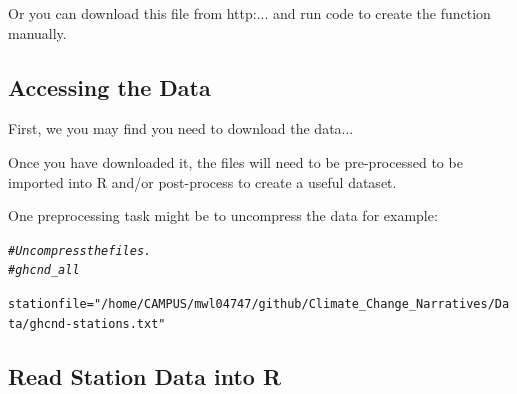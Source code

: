 \documentclass{article}\usepackage[]{graphicx}\usepackage[]{color}
\makeatletter
\newcommand{\hlstr}[1]{\textcolor[rgb]{0.192,0.494,0.8}{#1}}%
\newcommand{\hlcom}[1]{\textcolor[rgb]{0.678,0.584,0.686}{\textit{#1}}}%
\newcommand{\hlstd}[1]{\textcolor[rgb]{0.345,0.345,0.345}{#1}}%
\newcommand{\hlkwb}[1]{\textcolor[rgb]{0.69,0.353,0.396}{#1}}%
\newenvironment{kframe}{%
 \def\at@end@of@kframe{}%
 \ifinner\ifhmode%
  \def\at@end@of@kframe{\end{minipage}}%
  \begin{minipage}{\columnwidth}%
 \fi\fi%
 \def\FrameCommand##1{\hskip\@totalleftmargin \hskip-\fboxsep
 \colorbox{shadecolor}{##1}\hskip-\fboxsep
     \hskip-\linewidth \hskip-\@totalleftmargin \hskip\columnwidth}%
 \MakeFramed {\advance\hsize-\width
   \@totalleftmargin\z@ \linewidth\hsize
   \@setminipage}}%
 {\par\unskip\endMakeFramed%
 \at@end@of@kframe}
\newenvironment{knitrout}{}{} %
\makeatother
\begin{document}
Or you can download this file from http:... and run code to create the function manually. 


\subsection{Accessing the Data}

First, we you may find you need to download the data...

Once you have downloaded it, the files will need to be pre-processed to be imported into R and/or post-process to create a useful dataset. 

One preprocessing task might be to uncompress the data for example:


\begin{knitrout}
\color{fgcolor}\begin{kframe}
\begin{alltt}
\hlcom{# Uncompress the files.}
\hlcom{# ghcnd_all}
\end{alltt}
\end{kframe}
\end{knitrout}


\begin{knitrout}
\color{fgcolor}\begin{kframe}
\begin{alltt}
\hlstd{stationfile} \hlkwb{=} \hlstr{"/home/CAMPUS/mwl04747/github/Climate_Change_Narratives/Data/ghcnd-stations.txt"}
\end{alltt}
\end{kframe}
\end{knitrout}

\subsection{Read Station Data into R}
\end{document}
